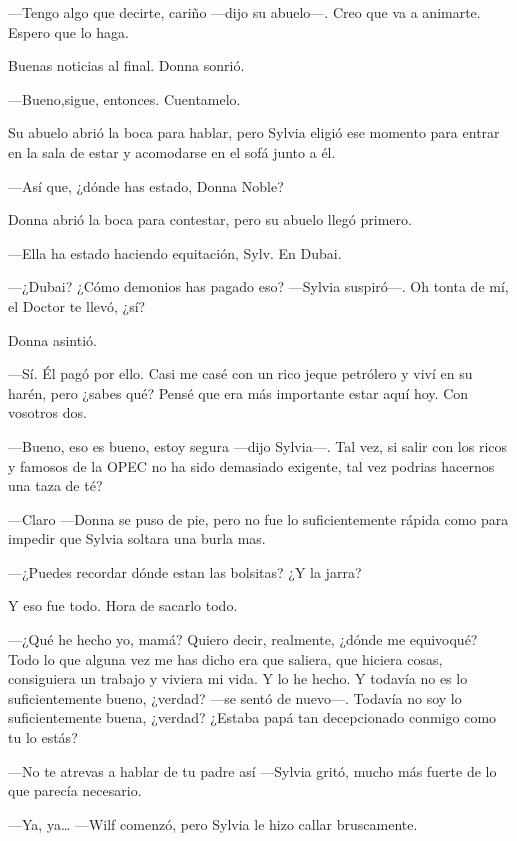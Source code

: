---Tengo algo que decirte, cariño ---dijo su abuelo---. Creo que va a
animarte. Espero que lo haga.

Buenas noticias al final. Donna sonrió.

---Bueno,sigue, entonces. Cuentamelo.

Su abuelo abrió la boca para hablar, pero Sylvia eligió ese momento para
entrar en la sala de estar y acomodarse en el sofá junto a él.

---Así que, ¿dónde has estado, Donna Noble?

Donna abrió la boca para contestar, pero su abuelo llegó primero.

---Ella ha estado haciendo equitación, Sylv. En Dubai.

---¿Dubai? ¿Cómo demonios has pagado eso? ---Sylvia suspiró---. Oh
tonta de mí, el Doctor te llevó, ¿sí?

Donna asintió.

---Sí. Él pagó por ello. Casi me casé con un rico jeque petrólero y viví
en su harén, pero ¿sabes qué? Pensé que era más importante estar aquí
hoy. Con vosotros dos.

---Bueno, eso es bueno, estoy segura ---dijo Sylvia---. Tal vez, si
salir con los ricos y famosos de la OPEC no ha sido demasiado exigente,
tal vez podrias hacernos una taza de té?

---Claro ---Donna se puso de pie, pero no fue lo suficientemente rápida
como para impedir que Sylvia soltara una burla mas.

---¿Puedes recordar dónde estan las bolsitas? ¿Y la jarra?

Y eso fue todo. Hora de sacarlo todo.

---¿Qué he hecho yo, mamá? Quiero decir, realmente, ¿dónde me
equivoqué? Todo lo que alguna vez me has dicho era que saliera, que
hiciera cosas, consiguiera un trabajo y viviera mi vida. Y lo he hecho.
Y todavía no es lo suficientemente bueno, ¿verdad? ---se sentó de
nuevo---. Todavía no soy lo suficientemente buena, ¿verdad? ¿Estaba
papá tan decepcionado conmigo como tu lo estás?

---No te atrevas a hablar de tu padre así ---Sylvia gritó, mucho más
fuerte de lo que parecía necesario.

---Ya, ya\ldots{} ---Wilf comenzó, pero Sylvia le hizo callar
bruscamente.


